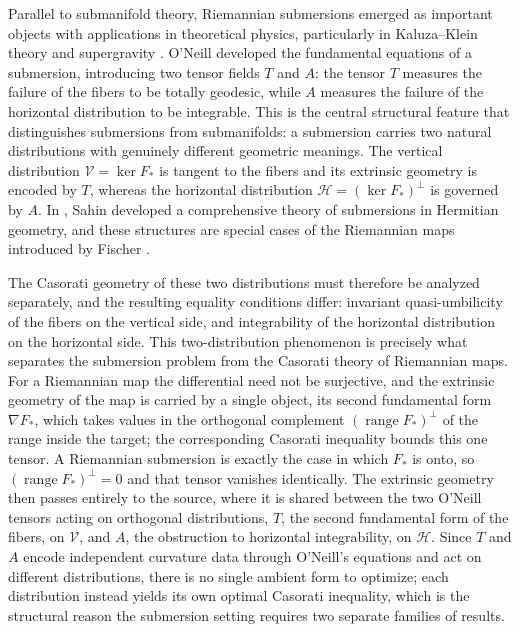 \documentclass[11pt]{amsart}
\theoremstyle{plain}
\theoremstyle{definition}
\theoremstyle{remark}
\newcommand{\calH}{\mathcal{H}}
\newcommand{\calV}{\mathcal{V}}
\begin{document}
Parallel to submanifold theory, Riemannian submersions emerged as important
objects with applications in theoretical physics, particularly in Kaluza--Klein
theory and supergravity \cite{Falcitelli2004, ONiell1966}. O'Neill
\cite{ONiell1966} developed the fundamental equations of a submersion,
introducing two tensor fields $T$ and $A$: the tensor $T$ measures the failure
of the fibers to be totally geodesic, while $A$ measures the failure of the
horizontal distribution to be integrable. This is the central structural
feature that distinguishes submersions from submanifolds: a submersion carries
{two} natural distributions with genuinely different geometric meanings.
The vertical distribution $\calV=\ker F_*$ is tangent to the fibers and its
extrinsic geometry is encoded by $T$, whereas the horizontal distribution
$\calH=(\ker F_*)^{\perp}$ is governed by $A$. In
\cite{Sahin2010a, Sahin2013, Sahin2017}, Sahin developed a comprehensive theory
of submersions in Hermitian geometry, and these structures are special cases of
the Riemannian maps introduced by Fischer \cite{Fischer1992}.

The Casorati geometry of these two distributions must therefore be analyzed
separately, and the resulting equality conditions differ: invariant
quasi-umbilicity of the fibers on the vertical side, and integrability of the
horizontal distribution on the horizontal side. This two-distribution
phenomenon is precisely what separates the submersion problem from the Casorati
theory of Riemannian maps. For a Riemannian map the differential need not be
surjective, and the extrinsic geometry of the map is carried by a single
object, its second fundamental form $\nabla F_*$, which takes values in the
orthogonal complement $(\operatorname{range} F_*)^{\perp}$ of the range inside
the target; the corresponding Casorati inequality bounds this one tensor. A
Riemannian submersion is exactly the case in which $F_*$ is onto, so
$(\operatorname{range} F_*)^{\perp}=0$ and that tensor vanishes identically. The
extrinsic geometry then passes entirely to the source, where it is shared
between the two O'Neill tensors acting on orthogonal distributions, $T$, the
second fundamental form of the fibers, on $\calV$, and $A$, the obstruction to
horizontal integrability, on $\calH$. Since $T$ and $A$ encode independent
curvature data through O'Neill's equations and act on different distributions,
there is no single ambient form to optimize; each distribution instead yields
its own optimal Casorati inequality, which is the structural reason the
submersion setting requires two separate families of results.
\end{document}
